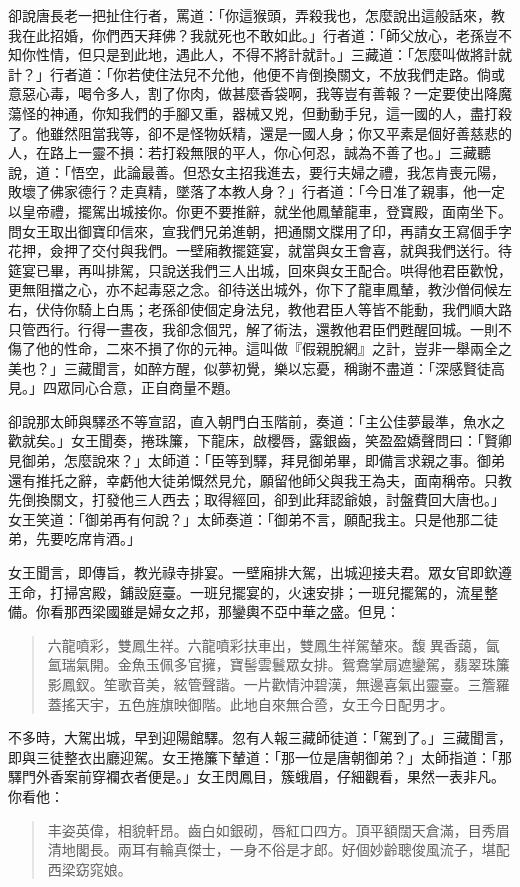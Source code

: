 卻說唐長老一把扯住行者，罵道：「你這猴頭，弄殺我也，怎麼說出這般話來，教我在此招婚，你們西天拜佛？我就死也不敢如此。」行者道：「師父放心，老孫豈不知你性情，但只是到此地，遇此人，不得不將計就計。」三藏道：「怎麼叫做將計就計？」行者道：「你若使住法兒不允他，他便不肯倒換關文，不放我們走路。倘或意惡心毒，喝令多人，割了你肉，做甚麼香袋啊，我等豈有善報？一定要使出降魔蕩怪的神通，你知我們的手腳又重，器械又兇，但動動手兒，這一國的人，盡打殺了。他雖然阻當我等，卻不是怪物妖精，還是一國人身；你又平素是個好善慈悲的人，在路上一靈不損：若打殺無限的平人，你心何忍，誠為不善了也。」三藏聽說，道：「悟空，此論最善。但恐女主招我進去，要行夫婦之禮，我怎肯喪元陽，敗壞了佛家德行？走真精，墜落了本教人身？」行者道：「今日准了親事，他一定以皇帝禮，擺駕出城接你。你更不要推辭，就坐他鳳輦龍車，登寶殿，面南坐下。問女王取出御寶印信來，宣我們兄弟進朝，把通關文牒用了印，再請女王寫個手字花押，僉押了交付與我們。一壁廂教擺筵宴，就當與女王會喜，就與我們送行。待筵宴已畢，再叫排駕，只說送我們三人出城，回來與女王配合。哄得他君臣歡悅，更無阻擋之心，亦不起毒惡之念。卻待送出城外，你下了龍車鳳輦，教沙僧伺候左右，伏侍你騎上白馬；老孫卻使個定身法兒，教他君臣人等皆不能動，我們順大路只管西行。行得一晝夜，我卻念個咒，解了術法，還教他君臣們甦醒回城。一則不傷了他的性命，二來不損了你的元神。這叫做『假親脫網』之計，豈非一舉兩全之美也？」三藏聞言，如醉方醒，似夢初覺，樂以忘憂，稱謝不盡道：「深感賢徒高見。」四眾同心合意，正自商量不題。

卻說那太師與驛丞不等宣詔，直入朝門白玉階前，奏道：「主公佳夢最準，魚水之歡就矣。」女王聞奏，捲珠簾，下龍床，啟櫻唇，露銀齒，笑盈盈嬌聲問曰：「賢卿見御弟，怎麼說來？」太師道：「臣等到驛，拜見御弟畢，即備言求親之事。御弟還有推托之辭，幸虧他大徒弟慨然見允，願留他師父與我王為夫，面南稱帝。只教先倒換關文，打發他三人西去；取得經回，卻到此拜認爺娘，討盤費回大唐也。」女王笑道：「御弟再有何說？」太師奏道：「御弟不言，願配我主。只是他那二徒弟，先要吃席肯酒。」

女王聞言，即傳旨，教光祿寺排宴。一壁廂排大駕，出城迎接夫君。眾女官即欽遵王命，打掃宮殿，鋪設庭臺。一班兒擺宴的，火速安排；一班兒擺駕的，流星整備。你看那西梁國雖是婦女之邦，那鑾輿不亞中華之盛。但見：
\begin{quote}
六龍噴彩，雙鳳生祥。六龍噴彩扶車出，雙鳳生祥駕輦來。馥𩡏異香藹，氤氳瑞氣開。金魚玉佩多官擁，寶髻雲鬟眾女排。鴛鴦掌扇遮鑾駕，翡翠珠簾影鳳釵。笙歌音美，絃管聲諧。一片歡情沖碧漢，無邊喜氣出靈臺。三簷羅蓋搖天宇，五色旌旗映御階。此地自來無合巹，女王今日配男才。
\end{quote}

不多時，大駕出城，早到迎陽館驛。忽有人報三藏師徒道：「駕到了。」三藏聞言，即與三徒整衣出廳迎駕。女王捲簾下輦道：「那一位是唐朝御弟？」太師指道：「那驛門外香案前穿襴衣者便是。」女王閃鳳目，簇蛾眉，仔細觀看，果然一表非凡。你看他：
\begin{quote}
丰姿英偉，相貌軒昂。齒白如銀砌，唇紅口四方。頂平額闊天倉滿，目秀眉清地閣長。兩耳有輪真傑士，一身不俗是才郎。好個妙齡聰俊風流子，堪配西梁窈窕娘。
\end{quote}

